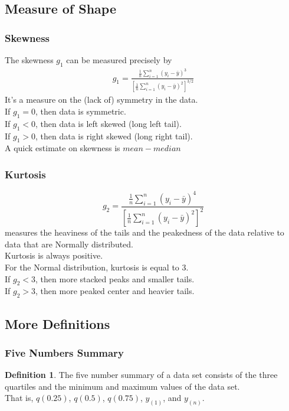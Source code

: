 \documentclass[12pt, leqno]{article}
\theoremstyle{definition}
\newtheorem*{defn}{Definition}
\begin{document}
  \subsection{Measure of Shape}
  \subsubsection{Skewness}
  The skewness $g_{1}$ can be measured precisely by
  \begin{align*}
  g_{1} =
  \frac{\frac{1}{n}\sum_{i=1}^{n}(y_{i} - \bar{y})^{3}}{\left[\frac{1}{n}\sum_{i=1}^{n}(y_{i} - \bar{y})^{2}\right]^{3/2}}
  \end{align*}
  It's a measure on the (lack of) symmetry in the data. \\
  If $g_{1} = 0$, then data is symmetric. \\
  If $g_{1} < 0$, then data is left skewed (long left tail). \\
  If $g_{1} > 0$, then data is right skewed (long right tail). \\
  A quick estimate on skewness is $mean - median$
  \subsubsection{Kurtosis}
  $$g_{2} = \frac{\frac{1}{n}\sum_{i=1}^{n}(y_{i} - \bar{y})^{4}}{\left[\frac{1}{n}\sum_{i=1}^{n}(y_{i} - \bar{y})^{2}\right]^{2}}$$
  measures the heaviness of the tails and the peakedness of the data relative to data that are Normally distributed. \\
  Kurtosis is always positive. \\
  For the Normal distribution, kurtosis is equal to 3. \\
  If $g_{2} < 3$, then more stacked peaks and smaller tails. \\
  If $g_{2} > 3$, then more peaked center and heavier tails.

  \subsection{More Definitions}
  \subsubsection{Five Numbers Summary}
  \begin{defn}
    The five number summary of a data set consists of the three quartiles and the minimum and maximum values of the data set. \\
    That is, $q(0.25)$, $q(0.5)$, $q(0.75)$, $y_{(1)}$, and $y_{(n)}$.
  \end{defn}
\end{document}
